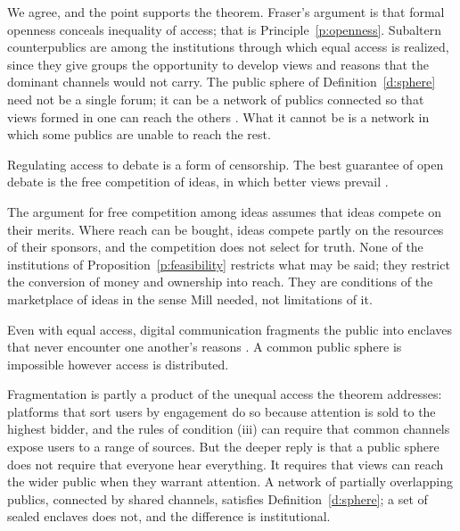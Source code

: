 \documentclass{situationist-preprint}
\begin{document}
\begin{reply}
We agree, and the point supports the theorem. Fraser's argument is that formal openness conceals inequality of access; that is Principle~\ref{p:openness}. Subaltern counterpublics are among the institutions through which equal access is realized, since they give groups the opportunity to develop views and reasons that the dominant channels would not carry. The public sphere of Definition~\ref{d:sphere} need not be a single forum; it can be a network of publics connected so that views formed in one can reach the others \citep{Mansbridge2012}. What it cannot be is a network in which some publics are unable to reach the rest.
\end{reply}

\begin{objection}
Regulating access to debate is a form of censorship. The best guarantee of open debate is the free competition of ideas, in which better views prevail \citep[ch.~II]{MillOL}.
\end{objection}

\begin{reply}
The argument for free competition among ideas assumes that ideas compete on their merits. Where reach can be bought, ideas compete partly on the resources of their sponsors, and the competition does not select for truth. None of the institutions of Proposition~\ref{p:feasibility} restricts what may be said; they restrict the conversion of money and ownership into reach. They are conditions of the marketplace of ideas in the sense Mill needed, not limitations of it.
\end{reply}

\begin{objection}[Fragmentation]
Even with equal access, digital communication fragments the public into enclaves that never encounter one another's reasons \citep{Sunstein2001}. A common public sphere is impossible however access is distributed.
\end{objection}

\begin{reply}
Fragmentation is partly a product of the unequal access the theorem addresses: platforms that sort users by engagement do so because attention is sold to the highest bidder, and the rules of condition (iii) can require that common channels expose users to a range of sources. But the deeper reply is that a public sphere does not require that everyone hear everything. It requires that views can reach the wider public when they warrant attention. A network of partially overlapping publics, connected by shared channels, satisfies Definition~\ref{d:sphere}; a set of sealed enclaves does not, and the difference is institutional.
\end{reply}
\end{document}
